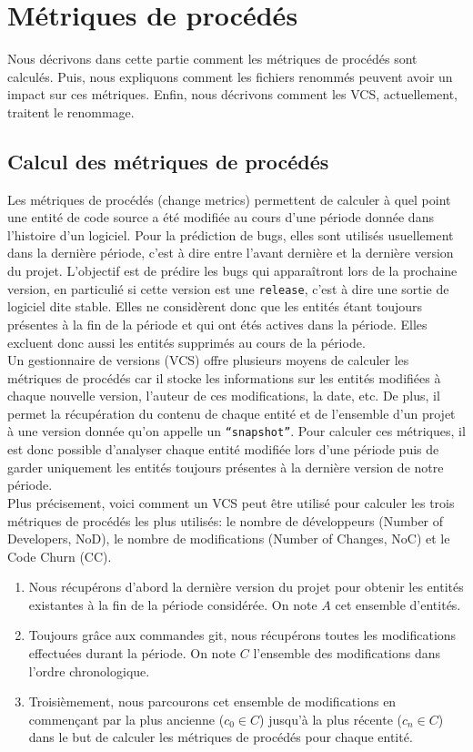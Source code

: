 \section{Métriques de procédés}
\label{sec:metriques}

Nous décrivons dans cette partie comment les métriques de procédés sont calculés. Puis, nous expliquons comment les fichiers renommés peuvent avoir un impact sur ces métriques. Enfin, nous décrivons comment les VCS, actuellement, traitent le renommage.

\subsection{Calcul des métriques de procédés}

Les métriques de procédés (change metrics) permettent de calculer à quel point une entité de code source a été modifiée au cours d'une période donnée dans l'histoire d'un logiciel. Pour la prédiction de bugs, elles sont utilisés usuellement dans la dernière période, c'est à dire entre l'avant dernière et la dernière version du projet. L'objectif est de prédire les bugs qui apparaîtront lors de la prochaine version, en particulié si cette version est une \texttt{release}, c'est à dire une sortie de logiciel dite stable. Elles ne considèrent donc que les entités étant toujours présentes à la fin de la période et qui ont étés actives dans la période. Elles excluent donc aussi les entités supprimés au cours de la période.\\

Un gestionnaire de versions (VCS) offre plusieurs moyens de calculer les métriques de procédés car il stocke les informations sur les entités modifiées à chaque nouvelle version, l'auteur de ces modifications, la date, etc. De plus, il permet la récupération du contenu de chaque entité et de l'ensemble d'un projet à une version donnée qu'on appelle un \texttt{``snapshot''}. Pour calculer ces métriques, il est donc possible d'analyser chaque entité modifiée lors d'une période puis de garder uniquement les entités toujours présentes à la dernière version de notre période.\\

Plus précisement, voici comment un VCS peut être utilisé pour calculer les trois métriques de procédés les plus utilisés: le nombre de développeurs (Number of Developers, NoD), le nombre de modifications  (Number of Changes, NoC) et le Code Churn (CC). 
\begin{enumerate}
\item Nous récupérons d'abord la dernière version du projet pour obtenir les entités existantes à la fin de la période considérée. On note $A$ cet ensemble d'entités.
\item Toujours grâce aux commandes git, nous récupérons toutes les modifications effectuées durant la période. On note $C$ l'ensemble des modifications dans l'ordre chronologique.
\item Troisièmement, nous parcourons cet ensemble de modifications en commençant par la plus ancienne ($c_0 \in C$) jusqu'à la plus récente ($c_n \in C$) dans le but de calculer les métriques de procédés pour chaque entité.
\end{enumerate}

